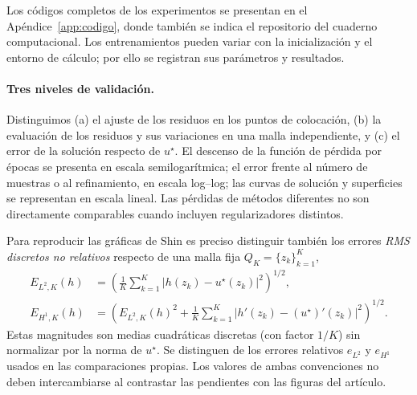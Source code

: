 Los códigos completos de los experimentos se presentan en el Apéndice~\ref{app:codigo},
donde también se indica el repositorio del cuaderno computacional. Los entrenamientos pueden variar
con la inicialización y el entorno de cálculo; por ello se registran sus parámetros y resultados.

\paragraph{Tres niveles de validación.}
Distinguimos (a) el ajuste de los residuos en los puntos de colocación, (b) la evaluación de los residuos y sus variaciones en una malla independiente, y (c) el error de la solución respecto de $u^\star$. El descenso de la función de pérdida por épocas se presenta en escala semilogarítmica; el error frente al número de muestras o al refinamiento, en escala log--log; las curvas de solución y superficies se representan en escala lineal. Las pérdidas de métodos diferentes no son directamente comparables cuando incluyen regularizadores distintos.

Para reproducir las gráficas de Shin es preciso distinguir también los errores \emph{RMS discretos no relativos} respecto de una malla fija $Q_K=\{z_k\}_{k=1}^K$,
\begin{align*}
E_{L^2,K}(h)&=\left(\frac1K\sum_{k=1}^{K}|h(z_k)-u^\star(z_k)|^2\right)^{1/2},\\
E_{H^1,K}(h)&=\left(E_{L^2,K}(h)^2+
\frac1K\sum_{k=1}^{K}|h'(z_k)-(u^\star)'(z_k)|^2\right)^{1/2}.
\end{align*}
Estas magnitudes son medias cuadráticas discretas (con factor $1/K$) sin normalizar por la norma de $u^\star$. Se distinguen de los errores relativos $e_{L^2}$ y $e_{H^1}$ usados en las comparaciones propias. Los valores de ambas convenciones no deben intercambiarse al contrastar las pendientes con las figuras del artículo.


